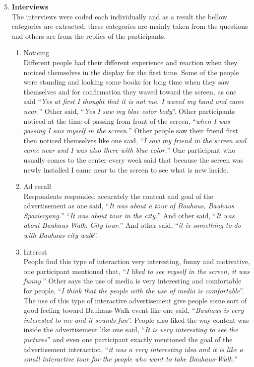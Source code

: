 \newpage


\begin{enumerate}
\setcounter{enumi}{4}
\item \textbf{Interviews} \\
The interviews were coded each individually and as a result the bellow categories are extracted, these categories are mainly taken from the questions and others are from the replies of the participants. 

\begin{enumerate}

\item Noticing \\
    Different people had their different experience and reaction when they noticed themselves in the display for the first time. Some of the people were standing and looking some books for long time when they saw themselves and for confirmation they waved toward the screen, as one said ``\emph{Yes at first I thought that it is not me. I waved my hand and came near.}'' Other said, ``\emph{Yes I saw my blue color body}''. Other participants noticed at the time of passing from front of the screen, ``\emph{when I was passing I saw myself in the screen.}'' Other people saw their friend first then noticed themselves like one said, ``\emph{I saw my friend in the screen and came near and I was also there with blue color.}'' One participant who usually comes to the center every week said that because the screen was newly installed I came near to the screen to see what is new inside.

\item Ad recall \\
    Respondents responded accurately the content and goal of the advertisement as one said, ``\emph{It was about a tour of Bauhaus, Bauhaus Spaziergang.}'' ``\emph{It was about tour in the city.}'' And other said, ``\emph{It was about Bauhaus-Walk. City tour.}'' And other said, ``\emph{it is something to do with Bauhaus city walk}''.

\item Interest \\
    People find this type of interaction very interesting, funny and motivative, one participant mentioned that, ``\emph{I liked to see myself in the screen, it was funny.}'' Other says the use of media is very interesting and comfortable for people, ``\emph{I think that the people with the use of media is comfortable}''. The use of this type of interactive advertisement give people some sort of good feeling toward Bauhaus-Walk event like one said, ``\emph{Bauhaus is very interested to me and it sounds fun}''. People also liked the way content was inside the advertisement like one said, ``\emph{It is very interesting to see the pictures}'' and even one participant exactly mentioned the goal of the advertisement interaction, ``\emph{it was a very interesting idea and it is like a small interactive tour for the people who want to take Bauhaus-Walk.}''


\end{enumerate}
\end{enumerate}
